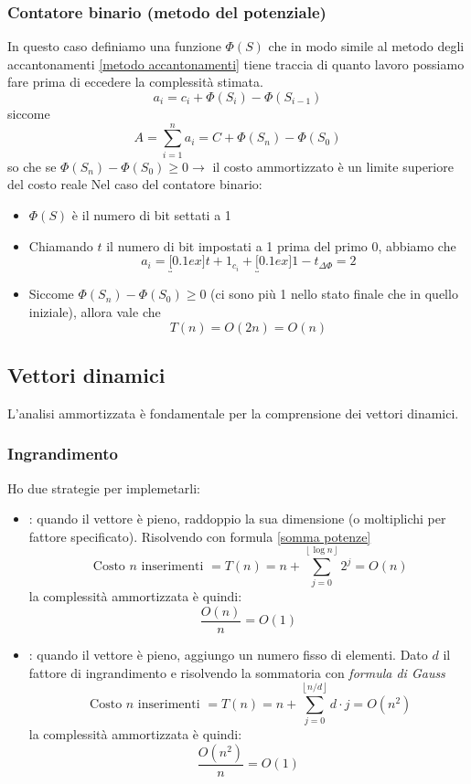 \subsubsection{Contatore binario (metodo del potenziale)}
In questo caso definiamo una funzione $ \Phi\left(S\right) $ che in modo simile al metodo degli accantonamenti \ref{metodo accantonamenti} tiene traccia di quanto lavoro possiamo fare prima di eccedere la complessità stimata.
\[
	a_i = c_i + \Phi \left(S_i\right) - \Phi \left(S_{i-1}\right)
\]
siccome
\[
	A = \sum_{i = 1}^{n} a_i = C + \Phi \left(S_n\right) - \Phi \left(S_0\right)
\]
so che se $ \Phi \left(S_n\right) - \Phi \left(S_0\right) \ge 0 \rightarrow $ il costo ammortizzato è un limite superiore del costo reale
\vskip3mm
Nel caso del contatore binario:
\begin{itemize}
	\item $ \Phi \left(S\right) $ è il numero di bit settati a 1
	\item Chiamando $ t $ il numero di bit impostati a 1 prima del primo 0, abbiamo che
	      \[
		      a_i = \underbracket[0.1ex]{t+1}_{c_i} + \underbracket[0.1ex]{1-t}_{\Delta \Phi } = 2
	      \]
	\item Siccome $ \Phi \left(S_n\right) - \Phi \left(S_0\right) \ge 0  $ (ci sono più 1 nello stato finale che in quello iniziale), allora vale che
	      \[
		      T\left(n\right) = O\left(2n\right) = O\left(n\right)
	      \]
\end{itemize}
\subsection{Vettori dinamici}
L'analisi ammortizzata è fondamentale per la comprensione dei vettori dinamici.
\subsubsection{Ingrandimento}
Ho due strategie per implemetarli:
\begin{itemize}
	\item {}: quando il vettore è pieno, raddoppio la sua dimensione (o moltiplichi per fattore specificato). Risolvendo con formula \ref{somma potenze}
	      \[
		      \text{ Costo } n \text{ inserimenti } = T\left(n\right) = n + \sum_{j=0}^{\left\lfloor \log n \right\rfloor }  2^{j} = O\left(n\right)
	      \]
	      la complessità ammortizzata è quindi:
	      \[
		      \frac{O\left(n\right)}{n} = O\left(1\right)
	      \]
	\item {}: quando il vettore è pieno, aggiungo un numero fisso di elementi. Dato $ d $ il fattore di ingrandimento e risolvendo la sommatoria con \textit{formula di Gauss}
	      \[
		      \text{ Costo } n \text{ inserimenti } = T\left(n\right) = n + \sum_{j=0}^{\left\lfloor n/d \right\rfloor }  d \cdot j = O\left(n^2 \right)
	      \]
	      la complessità ammortizzata è quindi:
	      \[
		      \frac{O\left(n^2 \right)}{n} = O\left(1\right)
	      \]
\end{itemize}

